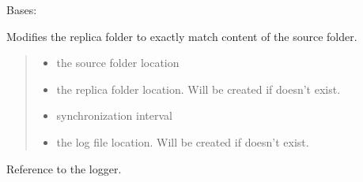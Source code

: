 \documentclass[letterpaper,10pt,english]{sphinxmanual}
\begin{document}
\begin{fulllineitems}
\label{\detokenize{sync:sync.syncer.Syncer}}
\pysigstartsignatures
{}
\pysigstopsignatures
\sphinxAtStartPar
Bases: 

\sphinxAtStartPar
Modifies the replica folder to exactly match content of the source folder.
\begin{quote}\begin{description}
\begin{itemize}
\item {} 
\sphinxAtStartPar
{} \textendash{} the source folder location

\item {} 
\sphinxAtStartPar
{} \textendash{} the replica folder location. Will be created if doesn’t exist.

\item {} 
\sphinxAtStartPar
{} \textendash{} synchronization interval

\item {} 
\sphinxAtStartPar
{} \textendash{} the log file location. Will be created if doesn’t exist.

\end{itemize}

\end{description}\end{quote}

\begin{fulllineitems}
\label{\detokenize{sync:sync.syncer.Syncer.log}}
\pysigstartsignatures
{}
\pysigstopsignatures
\sphinxAtStartPar
Reference to the logger.

\end{fulllineitems}



\end{fulllineitems}
\end{document}
